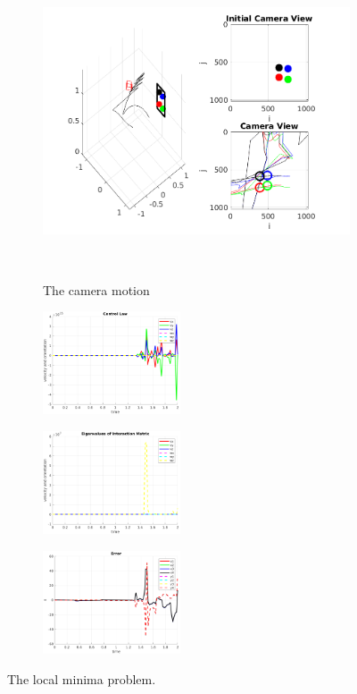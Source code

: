 \documentclass[a4paper,12pt]{article}
\begin{document}
\begin{figure}[t!]
		 \begin{subfigure}[b]{\textwidth}         
         	\centering
	         \includegraphics[width=13cm]{../results/Demo5-simulation.png}
    	     \caption{The camera motion}
    	     \vspace~
		 \end{subfigure}
         \begin{subfigure}[b]{0.32\textwidth}
        	\centering
	        \includegraphics[height=1.2in]{../results/Demo5-control-law.png}
		 \end{subfigure}
         \begin{subfigure}[b]{0.2\textwidth}
        	\centering
	        \includegraphics[height=1.2in]{../results/Demo5-eignen.png}
		 \end{subfigure}%
         \begin{subfigure}[b]{0.32\textwidth}
        	\centering
	        \includegraphics[height=1.2in]{../results/Demo5-error.png}
		 \end{subfigure}%
         \caption{The local minima problem.} 
 	\label{fig:demo5} 
\end{figure}
\end{document}
